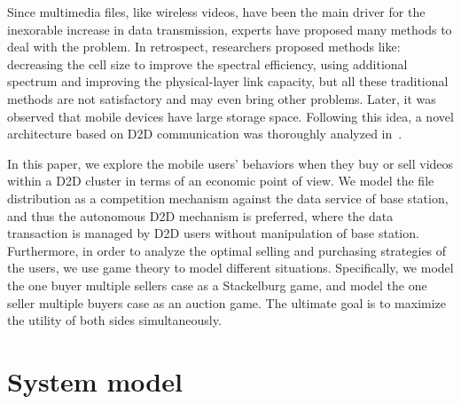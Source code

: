 \documentclass[11pt,draftcls]{IEEEtran}{\onecolumn}
\begin{document}
Since multimedia files, like wireless videos, have been the main driver for the inexorable increase in data transmission, experts have proposed many methods to deal with the problem. In retrospect, researchers proposed methods like: decreasing the cell size to improve the spectral efficiency, using additional spectrum and improving the physical-layer link capacity, but all these traditional methods are not satisfactory and may even bring other problems. Later, it was observed that mobile devices have large storage space. Following this idea, a novel architecture based on D2D communication was thoroughly analyzed in~\cite{11}.

In this paper, we explore the mobile users' behaviors when they buy or sell videos within a D2D cluster in terms of an economic point of view. We model the file distribution as a competition mechanism against the data service of base station, and thus the autonomous D2D mechanism is preferred, where the data transaction is managed by D2D users without manipulation of base station. Furthermore, in order to analyze the optimal selling and purchasing strategies of the users, we use game theory to model different situations. Specifically, we model the one buyer multiple sellers case as a Stackelburg game, and model the one seller multiple buyers case as an auction game. The ultimate goal is to maximize the utility of both sides simultaneously.




\section{System model}
\end{document}
